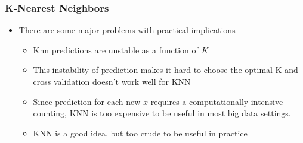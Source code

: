 \documentclass[
  shownotes,
  xcolor={svgnames},
  hyperref={colorlinks,citecolor=DarkBlue,linkcolor=andesred,urlcolor=DarkBlue}
  , aspectratio=169]{beamer}
\begin{document}
\begin{frame}[fragile]
\end{frame}


\begin{frame}[fragile]
\frametitle{K-Nearest Neighbors}
\begin{itemize}

  \item There are some major problems with practical implications
  \begin{itemize}
  \item Knn predictions are unstable as a function of $K$
  \medskip
  \item This instability of prediction makes it hard to choose the optimal K and cross validation doesn't work well for KNN
  \medskip
  \item Since prediction for each new $x$ requires a computationally intensive counting, KNN is too expensive to be useful in most big data settings.
  \medskip
  \item KNN is a good idea, but too crude to be useful in practice
  \end{itemize}
\end{itemize}

 \end{frame}

\end{document}
